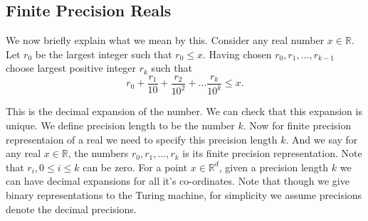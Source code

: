 	
	
	\subsection{Finite Precision Reals}
	We now briefly explain what we mean by this.
	Consider any real number $x \in \mathbb{R}$. Let $r_0$ be the largest integer such that $r_0 \leq x$. Having chosen $r_0,r_1,\ldots,r_{k-1}$ choose largest positive integer $r_k$ such that
	\[ r_0 + \frac{r_1}{10} + \frac{r_2}{10^2} + \ldots \frac{r_k}{10^k} \leq x. \]
	
	This is the decimal expansion of the number. We can check that this expansion is unique. We define precision length to be the number $k$.
	Now for finite precision representaion of a real we need to specify this precision length $k$. And we say for any real $x \in \mathbb{R}$, the numbers $r_0,r_1,\ldots,r_k$ is its finite precision representation. Note that $r_i, 0\leq i \leq k$ can be zero.  %
	For a point $x \in \mathbb{R}^d$, given a precision length $k$ we can have decimal expansions for all it's co-ordinates.
	Note that though we give binary representations to the Turing machine, for simplicity we assume precisions denote the decimal precisions.
	

